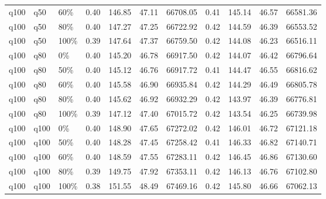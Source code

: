 \begin{longtable}{lllrrrrrrrr}
  q100 & q50 & 60\% & 0.40 & 146.85 & 47.11 & 66708.05 & 0.41 & 145.14 & 46.57 & 66581.36 \\ 
  q100 & q50 & 80\% & 0.40 & 147.27 & 47.25 & 66722.92 & 0.42 & 144.59 & 46.39 & 66553.52 \\ 
  q100 & q50 & 100\% & 0.39 & 147.64 & 47.37 & 66759.50 & 0.42 & 144.08 & 46.23 & 66516.11 \\ 
  q100 & q80 & 0\% & 0.40 & 145.20 & 46.78 & 66917.50 & 0.42 & 144.07 & 46.42 & 66796.64 \\ 
  q100 & q80 & 50\% & 0.40 & 145.12 & 46.76 & 66917.72 & 0.41 & 144.47 & 46.55 & 66816.62 \\ 
  q100 & q80 & 60\% & 0.40 & 145.58 & 46.90 & 66935.84 & 0.42 & 144.29 & 46.49 & 66805.78 \\ 
  q100 & q80 & 80\% & 0.40 & 145.62 & 46.92 & 66932.29 & 0.42 & 143.97 & 46.39 & 66776.81 \\ 
  q100 & q80 & 100\% & 0.39 & 147.12 & 47.40 & 67015.72 & 0.42 & 143.54 & 46.25 & 66739.98 \\ 
  q100 & q100 & 0\% & 0.40 & 148.90 & 47.65 & 67272.02 & 0.42 & 146.01 & 46.72 & 67121.18 \\ 
  q100 & q100 & 50\% & 0.40 & 148.28 & 47.45 & 67258.42 & 0.41 & 146.33 & 46.82 & 67140.71 \\ 
  q100 & q100 & 60\% & 0.40 & 148.59 & 47.55 & 67283.11 & 0.42 & 146.45 & 46.86 & 67130.60 \\ 
  q100 & q100 & 80\% & 0.39 & 149.75 & 47.92 & 67353.11 & 0.42 & 146.13 & 46.76 & 67102.80 \\ 
  q100 & q100 & 100\% & 0.38 & 151.55 & 48.49 & 67469.16 & 0.42 & 145.80 & 46.66 & 67062.13 \\ 
  \hline
\end{longtable}
\endgroup